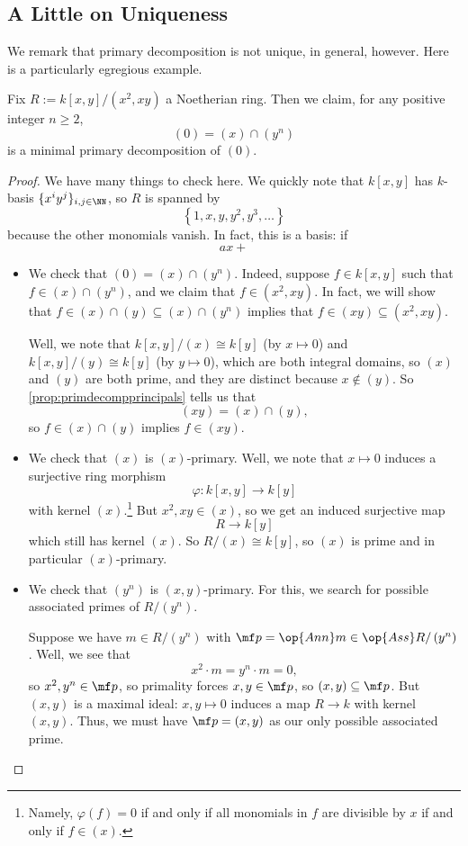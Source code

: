 \documentclass[../notes.tex]{subfiles}
\begin{document}
\subsection{A Little on Uniqueness}
We remark that primary decomposition is not unique, in general, however. Here is a particularly egregious example.
\begin{exe}
	Fix $R:=k[x,y]/\left(x^2,xy\right)$ a Noetherian ring. Then we claim, for any positive integer $n\ge2$,
	\[(0)=(x)\cap\left(y^n\right)\]
	is a minimal primary decomposition of $(0)$.
\end{exe}
\begin{proof}
	We have many things to check here. We quickly note that $k[x,y]$ has $k$-basis $\{x^iy^j\}_{i,j\in\NN}$, so $R$ is spanned by
	\[\left\{1,x,y,y^2,y^3,\ldots\right\}\]
	because the other monomials vanish. In fact, this is a basis: if
	\[ax+\]
	\begin{itemize}
		\item We check that $(0)=(x)\cap\left(y^n\right)$. Indeed, suppose $f\in k[x,y]$ such that $f\in(x)\cap\left(y^n\right)$, and we claim that $f\in\left(x^2,xy\right)$. In fact, we will show that $f\in(x)\cap(y)\subseteq(x)\cap\left(y^n\right)$ implies that $f\in(xy)\subseteq\left(x^2,xy\right)$.
		
		Well, we note that $k[x,y]/(x)\cong k[y]$ (by $x\mapsto0$) and $k[x,y]/(y)\cong k[y]$ (by $y\mapsto0$), which are both integral domains, so $(x)$ and $(y)$ are both prime, and they are distinct because $x\notin(y)$. So \autoref{prop:primdecompprincipals} tells us that
		\[(xy)=(x)\cap(y),\]
		so $f\in(x)\cap(y)$ implies $f\in(xy)$.

		\item We check that $(x)$ is $(x)$-primary. Well, we note that $x\mapsto0$ induces a surjective ring morphism
		\[\varphi:k[x,y]\to k[y]\]
		with kernel $(x)$.\footnote{Namely, $\varphi(f)=0$ if and only if all monomials in $f$ are divisible by $x$ if and only if $f\in(x)$.} But $x^2,xy\in(x)$, so we get an induced surjective map
		\[R\to k[y]\]
		which still has kernel $(x)$. So $R/(x)\cong k[y]$, so $(x)$ is prime and in particular $(x)$-primary.

		\item We check that $\left(y^n\right)$ is $(x,y)$-primary. For this, we search for possible associated primes of $R/\left(y^n\right)$.
		
		Suppose we have $m\in R/\left(y^n\right)$ with $\mf p=\op{Ann}m\in\op{Ass}R/\left(y^n\right)$. Well, we see that
		\[x^2\cdot m=y^n\cdot m=0,\]
		so $x^2,y^n\in\mf p$, so primality forces $x,y\in\mf p$, so $(x,y)\subseteq\mf p$. But $(x,y)$ is a maximal ideal: $x,y\mapsto0$ induces a map $R\to k$ with kernel $(x,y)$. Thus, we must have $\mf p=(x,y)$ as our only possible associated prime.


\end{itemize}
\end{proof}
\end{document}
